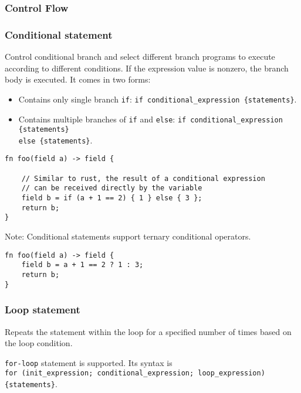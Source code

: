 \subsubsection{Control Flow}

\subsubsection*{Conditional statement}

Control conditional branch and select different branch programs to execute according to different conditions. 
If the expression value is nonzero, the branch body is executed.
It comes in two forms:

\begin{itemize}
    \item Contains only single branch \verb|if|: \verb|if conditional_expression {statements}|.
    \item Contains multiple branches of \verb|if| and \verb|else|: 
    \verb|if conditional_expression {statements}| \\
    \verb|else {statements}|.

\end{itemize}

\begin{lstlisting}
fn foo(field a) -> field {
    
    // Similar to rust, the result of a conditional expression 
    // can be received directly by the variable
    field b = if (a + 1 == 2) { 1 } else { 3 };
    return b;
}
\end{lstlisting}

Note: Conditional statements support ternary conditional operators.

\begin{lstlisting}
fn foo(field a) -> field {
    field b = a + 1 == 2 ? 1 : 3;
    return b;
}
\end{lstlisting}

\subsubsection*{Loop statement}

Repeats the statement within the loop for a specified number of times based on the loop condition.

\verb|for-loop| statement is supported. Its syntax is \\
\verb|for (init_expression; conditional_expression; loop_expression) {statements}|.

